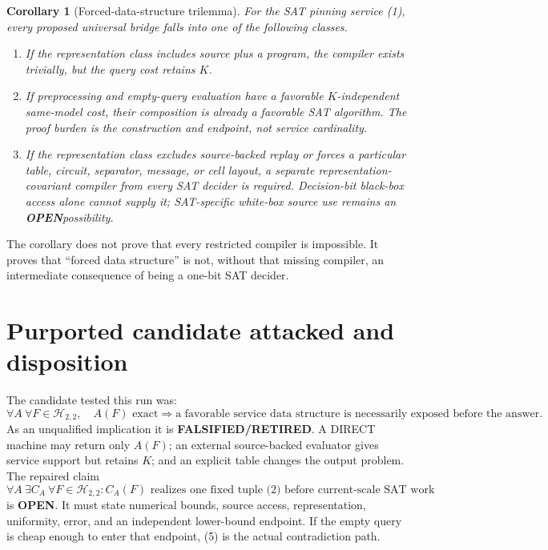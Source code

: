 \documentclass[11pt]{article}
\newtheorem{corollary}[theorem]{Corollary}
\newcommand{\OPEN}{\textbf{OPEN}}
\newcommand{\RETIRED}{\textbf{FALSIFIED/RETIRED}}
\begin{document}
\begin{corollary}[Forced-data-structure trilemma]
For the SAT pinning service (1), every proposed universal bridge falls into
one of the following classes.
\begin{enumerate}[leftmargin=*]
\item If the representation class includes source plus a program, the
compiler exists trivially, but the query cost retains $K$.
\item If preprocessing and empty-query evaluation have a favorable
$K$-independent same-model cost, their composition is already a favorable SAT
algorithm.  The proof burden is the construction and endpoint, not service
cardinality.
\item If the representation class excludes source-backed replay or forces a
particular table, circuit, separator, message, or cell layout, a separate
representation-covariant compiler from every SAT decider is required.
Decision-bit black-box access alone cannot supply it; SAT-specific white-box
source use remains an \OPEN possibility.
\end{enumerate}
\end{corollary}

The corollary does not prove that every restricted compiler is impossible.
It proves that ``forced data structure'' is not, without that missing
compiler, an intermediate consequence of being a one-bit SAT decider.

\section{Purported candidate attacked and disposition}

The candidate tested this run was:
\[
\tag{GENERIC-DS-FORCING1}
\forall A\ \forall F\in\mathcal H_{2,2},\quad
A(F)\text{ exact}\Longrightarrow
\text{a favorable service data structure is necessarily exposed before the answer.}
\]
As an unqualified implication it is \RETIRED.  A DIRECT machine may return
only $A(F)$; an external source-backed evaluator gives service support but
retains $K$; and an explicit table changes the output problem.  The repaired
claim
\[
\tag{RESTRICTED-DS-COMPILER1}
\forall A\ \exists C_A\ \forall F\in\mathcal H_{2,2}:
C_A(F)\text{ realizes one fixed tuple (2) before current-scale SAT work}
\]
is \OPEN.  It must state numerical bounds, source access, representation,
uniformity, error, and an independent lower-bound endpoint.  If the empty
query is cheap enough to enter that endpoint, (5) is the actual contradiction
path.
\end{document}
